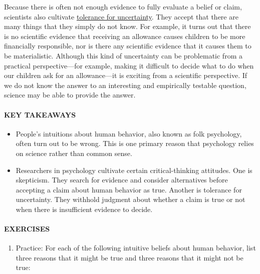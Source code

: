 \documentclass[
]{krantz}
\providecommand{\tightlist}{%
  \setlength{\itemsep}{0pt}\setlength{\parskip}{0pt}}
\begin{document}
Because there is often not enough evidence to fully evaluate a belief or claim, scientists also cultivate \protect\hyperlink{tolerance-for-uncertainty}{tolerance for uncertainty}. They accept that there are many things that they simply do not know. For example, it turns out that there is no scientific evidence that receiving an allowance causes children to be more financially responsible, nor is there any scientific evidence that it causes them to be materialistic. Although this kind of uncertainty can be problematic from a practical perspective---for example, making it difficult to decide what to do when our children ask for an allowance---it is exciting from a scientific perspective. If we do not know the answer to an interesting and empirically testable question, science may be able to provide the answer.

\hypertarget{key-takeaways-2}{%
\paragraph*{KEY TAKEAWAYS}\label{key-takeaways-2}}

\begin{itemize}
\tightlist
\item
  People's intuitions about human behavior, also known as folk psychology, often turn out to be wrong. This is one primary reason that psychology relies on science rather than common sense.
\item
  Researchers in psychology cultivate certain critical-thinking attitudes. One is skepticism. They search for evidence and consider alternatives before accepting a claim about human behavior as true. Another is tolerance for uncertainty. They withhold judgment about whether a claim is true or not when there is insufficient evidence to decide.
\end{itemize}

\hypertarget{exercises-2}{%
\paragraph*{EXERCISES}\label{exercises-2}}

\begin{enumerate}
\def\labelenumi{\arabic{enumi}.}
\tightlist
\item
  Practice: For each of the following intuitive beliefs about human behavior, list three reasons that it might be true and three reasons that it might not be true:
\end{enumerate}
\end{document}
